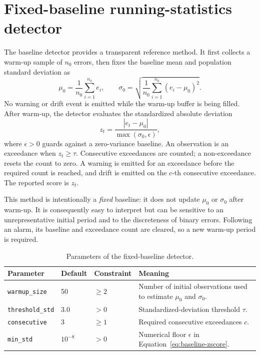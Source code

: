 \section{Fixed-baseline running-statistics detector}
\label{sec:baseline-detector}

The baseline detector provides a transparent reference method. It first collects a warm-up sample of $n_0$ errors, then fixes the baseline mean and population standard deviation as
\begin{equation}
 \mu_0=\frac{1}{n_0}\sum_{i=1}^{n_0} e_i,
 \qquad
 \sigma_0=\sqrt{\frac{1}{n_0}\sum_{i=1}^{n_0}(e_i-\mu_0)^2}.
 \label{eq:baseline-statistics}
\end{equation}
No warning or drift event is emitted while the warm-up buffer is being filled. After warm-up, the detector evaluates the standardized absolute deviation
\begin{equation}
 z_t=\frac{|e_t-\mu_0|}{\max(\sigma_0,\epsilon)},
 \label{eq:baseline-zscore}
\end{equation}
where $\epsilon>0$ guards against a zero-variance baseline. An observation is an exceedance when $z_t\geq\tau$. Consecutive exceedances are counted; a non-exceedance resets the count to zero. A warning is emitted for an exceedance before the required count is reached, and drift is emitted on the $c$-th consecutive exceedance. The reported score is $z_t$.

This method is intentionally a \emph{fixed} baseline: it does not update $\mu_0$ or $\sigma_0$ after warm-up. It is consequently easy to interpret but can be sensitive to an unrepresentative initial period and to the discreteness of binary errors. Following an alarm, its baseline and exceedance count are cleared, so a new warm-up period is required.

\begin{table}[htbp]
\centering
\caption{Parameters of the fixed-baseline detector.}
\label{tab:baseline-parameters}
\begin{tabular}{@{}lllp{6.0cm}@{}}
\toprule
Parameter & Default & Constraint & Meaning \\
\midrule
\texttt{warmup\_size} & 50 & $\geq 2$ & Number of initial observations used to estimate $\mu_0$ and $\sigma_0$. \\
\texttt{threshold\_std} & 3.0 & $>0$ & Standardized-deviation threshold $\tau$. \\
\texttt{consecutive} & 3 & $\geq1$ & Required consecutive exceedances $c$. \\
\texttt{min\_std} & $10^{-8}$ & $>0$ & Numerical floor $\epsilon$ in Equation~\eqref{eq:baseline-zscore}. \\
\bottomrule
\end{tabular}
\end{table}

